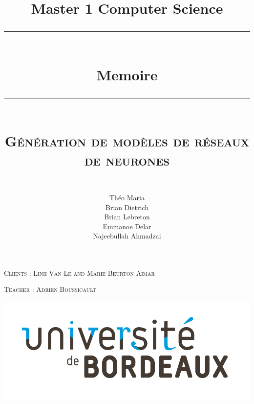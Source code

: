 \newcommand{\HRule}{\rule{\linewidth}{0.5mm}}
\begin{titlepage}
   \title{
       \large{Master 1 Computer Science}
       \HRule\\
       \LARGE\textbf{Memoire}
       \HRule\\
       \textsc{Génération de modèles de réseaux de neurones} %
   }
   
   
   \author{\\Théo Maria\\Brian Dietrich\\Brian Lebreton\\Emmanoe Delar\\Najeebullah Ahmadzai}
   
   \nointerlineskip
   \vfill
   \let\snewpage \newpage
   \let\newpage \relax
   \maketitle
   \let \newpage \snewpage
   
   \center
 
   \textsc{Clients : Linh Van Le and Marie Beurton-Aimar}
   
   \textsc{Teacher : Adrien Boussicault}
   
   \includegraphics[scale=0.2]{figures/logo.jpg}\\
   \break
   \vfill

\end{titlepage}